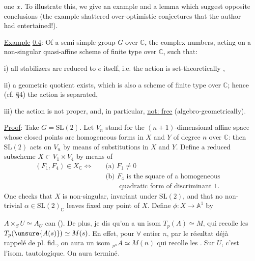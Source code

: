 
one $x$. To illustrate this, we give an example and a lemma which suggest opposite conclusions (the example shattered over-optimistic conjectures that the author had entertained!).

\uline{Example} \uline{0.4}: Of a semi-simple group $G$ over $\mathbb C$, the complex numbers, acting on a non-singular quasi-affine scheme of finite type over $\mathbb C$, such that:

i) all stabilizers are reduced to $e$ itself, i.e. the action is set-theoretically ,

ii) a geometric quotient exists, which is also a scheme of finite type over $\mathbb C$; hence (cf. \S4) the action is separated,

iii) the action is not proper, and, in particular, \uline{not: free} (algebro-geometrically).

\uline{Proof}: Take $G=\mathrm{SL}(2)$. Let $V_n$ stand for the $(n+1)$-dimensional affine space whose closed points are homogeneous forms in $X$ and $Y$ of degree $n$ over $\mathbb C$: then $\mathrm{SL}(2)$ acts on $V_n$ by means of substitutions in $X$ and $Y$. Define a reduced subscheme $X\subset V_1\times V_4$ by means of
\[
\begin{aligned}
(F_1,F_4)\in X_{\mathbb C}\Longleftrightarrow\quad &\text{(a) }F_1\ne0\\
&\text{(b) }F_4\text{ is the square of a homogeneous}\\
&\qquad\text{quadratic form of discriminant }1.
\end{aligned}
\]
One checks that $X$ is non-singular, invariant under $\mathrm{SL}(2)$, and that no non-trivial $\alpha\in \mathrm{SL}(2)_{\mathbb C}$ leaves fixed any point of $X$. Define $\phi:X\longrightarrow\mathbb A^1$ by

$A\times_S U\simeq A_U$ can (). De plus, je dis qu'on a un isom $T_p(A)\simeq M$, qui recolle les $T_p(\unsure{A(s)})\simeq M(s)$. En effet, pour $\forall$ entier $n$, par le résultat déjà rappelé de pl. fid., on aura un isom  ${}_{p^n}A\simeq M(n)$ qui recolle les
. Sur $U$, c'est l'isom. tautologique. On aura terminé.

